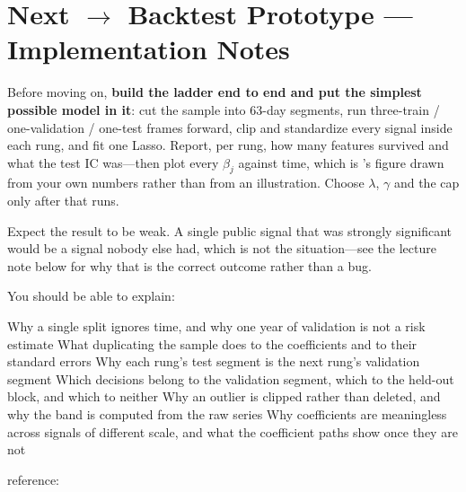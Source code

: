 \section*{Next $\rightarrow$ Backtest Prototype --- Implementation Notes}

Before moving on, \textbf{build the ladder end to end and put the simplest possible model in it}:
cut the sample into 63-day segments, run three-train / one-validation / one-test frames forward,
clip and standardize every signal inside each rung, and fit one Lasso. Report, per rung, how many
features survived and what the test IC was---then plot every $\beta_j$ against time, which is
's figure drawn from your own numbers rather than from an illustration.
Choose $\lambda$, $\gamma$ and the cap only after that runs.

Expect the result to be weak. A single public signal that was strongly significant would be a
signal nobody else had, which is not the situation---see the lecture note below for why that is
the correct outcome rather than a bug.


You should be able to explain:

\begin{checklist}
  \checkitem Why a single split ignores time, and why one year of validation is not a risk estimate
  \checkitem What duplicating the sample does to the coefficients and to their standard errors
  \checkitem Why each rung's test segment is the next rung's validation segment
  \checkitem Which decisions belong to the validation segment, which to the held-out block, and
             which to neither
  \checkitem Why an outlier is clipped rather than deleted, and why the band is computed from the
             raw series
  \checkitem Why coefficients are meaningless across signals of different scale, and what the
             coefficient paths show once they are not
\end{checklist}

\vspace{1em}
\noindent{} \midot{}
 \midot{} reference:
